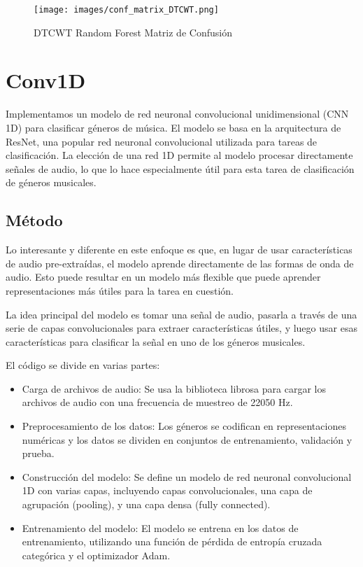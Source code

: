 \documentclass[colorinlistoftodos,twoside,twocolumn,10pt]{article} %
\begin{document}
\begin{figure}[h!] 
	\centering    
	\texttt{[image: images/conf\_matrix\_DTCWT.png]}    
	\caption{DTCWT Random Forest Matriz de Confusi\'on}
\end{figure}

\section{Conv1D}
Implementamos un modelo de red neuronal convolucional unidimensional (CNN 1D) para clasificar géneros de música. El modelo se basa en la arquitectura de ResNet, una popular red neuronal convolucional utilizada para tareas de clasificación. La elección de una red 1D permite al modelo procesar directamente señales de audio, lo que lo hace especialmente útil para esta tarea de clasificación de géneros musicales.

\subsection{Método}
Lo interesante y diferente en este enfoque es que, en lugar de usar características de audio pre-extraídas, el modelo aprende directamente de las formas de onda de audio. Esto puede resultar en un modelo más flexible que puede aprender representaciones más útiles para la tarea en cuestión.

La idea principal del modelo es tomar una señal de audio, pasarla a través de una serie de capas convolucionales para extraer características útiles, y luego usar esas características para clasificar la señal en uno de los géneros musicales.

El código se divide en varias partes:
\begin{itemize}
\item Carga de archivos de audio: Se usa la biblioteca librosa para cargar los archivos de audio con una frecuencia de muestreo de 22050 Hz.
\item Preprocesamiento de los datos: Los géneros se codifican en representaciones numéricas y los datos se dividen en conjuntos de entrenamiento, validación y prueba.
\item Construcción del modelo: Se define un modelo de red neuronal convolucional 1D con varias capas, incluyendo capas convolucionales, una capa de agrupación (pooling), y una capa densa (fully connected).
\item Entrenamiento del modelo: El modelo se entrena en los datos de entrenamiento, utilizando una función de pérdida de entropía cruzada categórica y el optimizador Adam.
\end{itemize}
\end{document}
